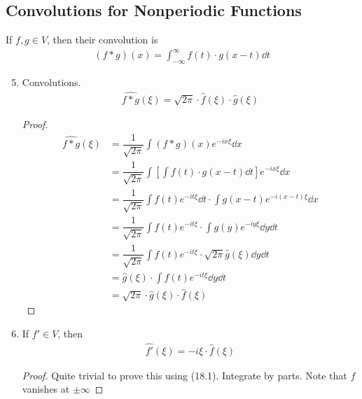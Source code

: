 \subsection{Convolutions for Nonperiodic Functions}
\begin{definition}
    If $f, g \in V$, then their convolution is
    \begin{align}
        (f * g)(x) = \int_{-\infty}^\infty f(t) \cdot g(x-t) \dd{t}
    \end{align}
\end{definition}
\begin{enumerate}
    \setcounter{enumi}{4}
    \item Convolutions.
    \begin{align}
        \boxed{\widehat{f*g}(\xi) = \sqrt{2\pi} \cdot \hat{f}(\xi) \cdot \hat{g}(\xi)}
    \end{align}
    \begin{proof}
        \begin{align}
            \widehat{f*g}(\xi) &= \dfrac{1}{\sqrt{2\pi}} \int (f*g)(x) e^{-ix\xi} \dd{x}\\
            &= \dfrac{1}{\sqrt{2\pi}} \int \left[ \int f(t) \cdot g(x-t) \dd{t} \right] e^{-ix\xi} \dd{x}\\
            &= \dfrac{1}{\sqrt{2\pi}} \int f(t) e^{-it\xi} \dd{t} \cdot \int g(x-t) e^{-i(x-t)\xi} \dd{x}\\
            &= \dfrac{1}{\sqrt{2\pi}} \int f(t) e^{-it\xi} \cdot \int g(y) e^{-iy\xi} \dd{y} \dd{t}\\
            &= \dfrac{1}{\sqrt{2\pi}} \int f(t) e^{-it\xi} \cdot \sqrt{2\pi} \hat{g}(\xi) \dd{y} \dd{t}\\
            &= \hat{g}(\xi) \cdot \int f(t) e^{-it\xi} \dd{y} \dd{t}\\
            &= \sqrt{2\pi} \cdot \hat{g}(\xi) \cdot \hat{f}(\xi)
        \end{align}
    \end{proof}
    \item If $f' \in V$, then
    \begin{align}
        \widehat{f'}(\xi) = -i\xi \cdot \hat{f}(\xi)
    \end{align}
    \begin{proof}
        Quite trivial to prove this using (18.1). Integrate by parts. Note that $f$ vanishes at $\pm \infty$
    \end{proof}
\end{enumerate}

